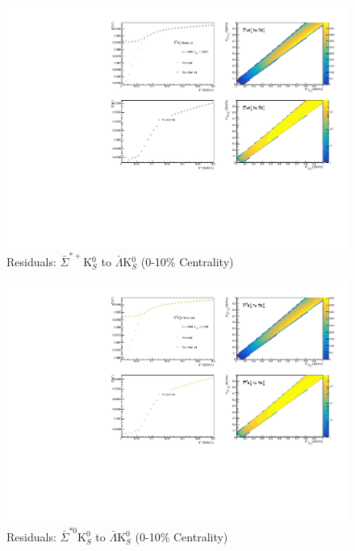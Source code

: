 \documentclass[../AnalysisNoteJBuxton.tex]{subfiles}
\begin{document}
\begin{figure}[h]
  \centering
  \includegraphics[width=\textwidth]{9_AdditionalFigures/Figures/Residuals/ALamK0/Residuals_ALamK0_0010_ASigStPK0_MomResCrctn_NonFlatBgdCrctn_SingleLamParam_10Res_PrimMaxDecay4fm_UsingXiDataAndCoulombOnly.pdf}
  \caption[Residuals: $\bar{\Sigma}^{*+}$K$^{0}_{S}$ to $\bar{\Lambda}$K$^{0}_{S}$ (0-10\% Centrality)]{Residuals: $\bar{\Sigma}^{*+}$K$^{0}_{S}$ to $\bar{\Lambda}$K$^{0}_{S}$ (0-10\% Centrality)}
  \label{fig:Res_ALamK0_0010_ASigStPK0}
\end{figure}

\begin{figure}[h]
  \centering
  \includegraphics[width=\textwidth]{9_AdditionalFigures/Figures/Residuals/ALamK0/Residuals_ALamK0_0010_ASigSt0K0_MomResCrctn_NonFlatBgdCrctn_SingleLamParam_10Res_PrimMaxDecay4fm_UsingXiDataAndCoulombOnly.pdf}
  \caption[Residuals: $\bar{\Sigma}^{*0}$K$^{0}_{S}$ to $\bar{\Lambda}$K$^{0}_{S}$ (0-10\% Centrality)]{Residuals: $\bar{\Sigma}^{*0}$K$^{0}_{S}$ to $\bar{\Lambda}$K$^{0}_{S}$ (0-10\% Centrality)}
  \label{fig:Res_ALamK0_0010_ASigSt0K0}
\end{figure}
\end{document}
